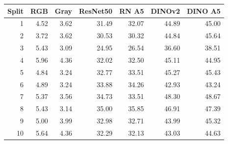 \begin{tabular}{rrrrrrr}
\toprule
Split & RGB & Gray & ResNet50 & RN A5 & DINOv2 & DINO A5 \\
\midrule
1 & 4.52 & 3.62 & 31.49 & 32.07 & 44.89 & 45.00 \\
2 & 3.72 & 3.62 & 30.53 & 30.32 & 44.84 & 45.64 \\
3 & 5.43 & 3.09 & 24.95 & 26.54 & 36.60 & 38.51 \\
4 & 5.96 & 4.36 & 32.02 & 32.50 & 45.11 & 44.95 \\
5 & 4.84 & 3.24 & 32.77 & 33.51 & 45.27 & 45.43 \\
6 & 4.89 & 3.24 & 33.88 & 34.26 & 42.93 & 43.24 \\
7 & 5.37 & 3.56 & 34.73 & 33.51 & 48.30 & 48.67 \\
8 & 5.43 & 3.14 & 35.00 & 35.85 & 46.91 & 47.39 \\
9 & 5.00 & 3.99 & 32.98 & 32.71 & 43.99 & 45.32 \\
10 & 5.64 & 4.36 & 32.29 & 32.13 & 43.03 & 44.63 \\
\bottomrule
\end{tabular}
